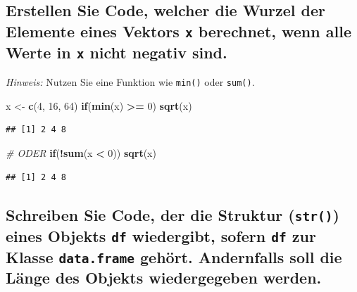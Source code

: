 \documentclass[12pt,a4paper]{article}
\newenvironment{Shaded}{\begin{snugshade}}{\end{snugshade}}
\newcommand{\CommentTok}[1]{\textcolor[rgb]{0.56,0.35,0.01}{\textit{#1}}}
\newcommand{\ControlFlowTok}[1]{\textcolor[rgb]{0.13,0.29,0.53}{\textbf{#1}}}
\newcommand{\DecValTok}[1]{\textcolor[rgb]{0.00,0.00,0.81}{#1}}
\newcommand{\FunctionTok}[1]{\textcolor[rgb]{0.13,0.29,0.53}{\textbf{#1}}}
\newcommand{\NormalTok}[1]{#1}
\newcommand{\OtherTok}[1]{\textcolor[rgb]{0.56,0.35,0.01}{#1}}
\newcommand{\SpecialCharTok}[1]{\textcolor[rgb]{0.81,0.36,0.00}{\textbf{#1}}}
\begin{document}
\hypertarget{erstellen-sie-code-welcher-die-wurzel-der-elemente-eines-vektors-berechnet-wenn-alle-werte-in-nicht-negativ-sind.}{%
\subsection{\texorpdfstring{Erstellen Sie Code, welcher die Wurzel der
Elemente eines Vektors \texttt{x} berechnet, wenn alle Werte in
\texttt{x} nicht negativ
sind.}{Erstellen Sie Code, welcher die Wurzel der Elemente eines Vektors  berechnet, wenn alle Werte in  nicht negativ sind.}}\label{erstellen-sie-code-welcher-die-wurzel-der-elemente-eines-vektors-berechnet-wenn-alle-werte-in-nicht-negativ-sind.}}

\emph{Hinweis:} Nutzen Sie eine Funktion wie \texttt{min()} oder
\texttt{sum()}.

\begin{Shaded}
\begin{Highlighting}[]
\NormalTok{    x }\OtherTok{\textless{}{-}} \FunctionTok{c}\NormalTok{(}\DecValTok{4}\NormalTok{, }\DecValTok{16}\NormalTok{, }\DecValTok{64}\NormalTok{)}
    \ControlFlowTok{if}\NormalTok{(}\FunctionTok{min}\NormalTok{(x) }\SpecialCharTok{\textgreater{}=} \DecValTok{0}\NormalTok{) }\FunctionTok{sqrt}\NormalTok{(x)}
\end{Highlighting}
\end{Shaded}

\begin{verbatim}
## [1] 2 4 8
\end{verbatim}

\begin{Shaded}
\begin{Highlighting}[]
    \CommentTok{\# ODER}
    \ControlFlowTok{if}\NormalTok{(}\SpecialCharTok{!}\FunctionTok{sum}\NormalTok{(x }\SpecialCharTok{\textless{}} \DecValTok{0}\NormalTok{)) }\FunctionTok{sqrt}\NormalTok{(x)}
\end{Highlighting}
\end{Shaded}

\begin{verbatim}
## [1] 2 4 8
\end{verbatim}

\hypertarget{schreiben-sie-code-der-die-struktur-eines-objekts-wiedergibt-sofern-zur-klasse-gehuxf6rt.-andernfalls-soll-die-luxe4nge-des-objekts-wiedergegeben-werden.}{%
\subsection{\texorpdfstring{Schreiben Sie Code, der die Struktur
(\texttt{str()}) eines Objekts \texttt{df} wiedergibt, sofern
\texttt{df} zur Klasse \texttt{data.frame} gehört. Andernfalls soll die
Länge des Objekts wiedergegeben
werden.}{Schreiben Sie Code, der die Struktur () eines Objekts  wiedergibt, sofern  zur Klasse  gehört. Andernfalls soll die Länge des Objekts wiedergegeben werden.}}\label{schreiben-sie-code-der-die-struktur-eines-objekts-wiedergibt-sofern-zur-klasse-gehuxf6rt.-andernfalls-soll-die-luxe4nge-des-objekts-wiedergegeben-werden.}}
\end{document}
